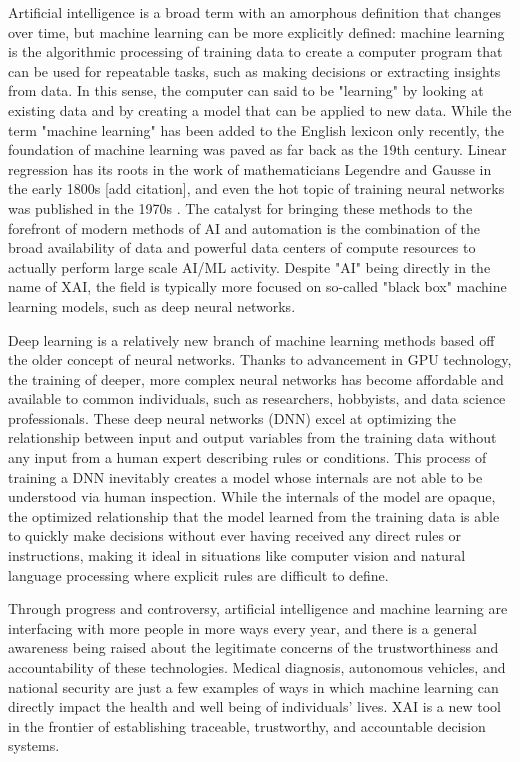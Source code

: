 \documentclass{IEEEtran}
\begin{document}
Artificial intelligence is a broad term with an amorphous definition that changes over time, but machine learning can be more explicitly defined: machine learning is the algorithmic processing of training data to create a computer program that can be used for repeatable tasks, such as making decisions or extracting insights from data.  In this sense, the computer can said to be "learning" by looking at existing data and by creating a model that can be applied to new data.  While the term "machine learning" has been added to the English lexicon only recently, the foundation of machine learning was paved as far back as the 19th century.  Linear regression has its roots in the work of mathematicians Legendre and Gausse in the early 1800s [add citation], and even the hot topic of training neural networks was published in the 1970s \cite{Werbos1974}.  The catalyst for bringing these methods to the forefront of modern methods of AI and automation is the combination of the broad availability of data and powerful data centers of compute resources to actually perform large scale AI/ML activity.  Despite "AI" being directly in the name of XAI, the field is typically more focused on so-called "black box" machine learning models, such as deep neural networks.

Deep learning is a relatively new branch of machine learning methods based off the older concept of neural networks.  Thanks to advancement in GPU technology, the training of deeper, more complex neural networks has become affordable and available to common individuals, such as researchers, hobbyists, and data science professionals.  These deep neural networks (DNN) excel at optimizing the relationship between input and output variables from the training data without any input from a human expert describing rules or conditions.  This process of training a DNN inevitably creates a model whose internals are not able to be  understood via human inspection.  While the internals of the model are opaque, the optimized relationship that the model learned from the training data is able to quickly make decisions without ever having received any direct rules or instructions, making it ideal in situations like computer vision and natural language processing where explicit rules are difficult to define.

Through progress and controversy, artificial intelligence and machine learning are interfacing with more people in more ways every year, and there is a general awareness being raised about the legitimate concerns of the trustworthiness and accountability of these technologies.  Medical diagnosis, autonomous vehicles, and national security are just a few examples of ways in which machine learning can directly impact the health and well being of individuals' lives.  XAI is a new tool in the frontier of establishing traceable, trustworthy, and accountable decision systems.
\end{document}
